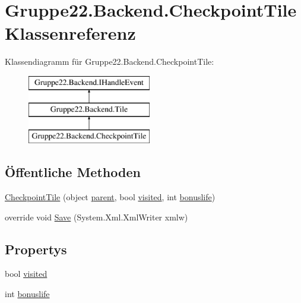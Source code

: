 \hypertarget{class_gruppe22_1_1_backend_1_1_checkpoint_tile}{\section{Gruppe22.\-Backend.\-Checkpoint\-Tile Klassenreferenz}
\label{class_gruppe22_1_1_backend_1_1_checkpoint_tile}
}
Klassendiagramm für Gruppe22.\-Backend.\-Checkpoint\-Tile\-:\begin{figure}[H]
\begin{center}
\leavevmode
\includegraphics[height=3.000000cm]{class_gruppe22_1_1_backend_1_1_checkpoint_tile}
\end{center}
\end{figure}
\subsection*{Öffentliche Methoden}
\begin{DoxyCompactItemize}
\item 
\hyperlink{class_gruppe22_1_1_backend_1_1_checkpoint_tile_a72935c5b488d2ef10c746a6f0b7ac8ba}{Checkpoint\-Tile} (object \hyperlink{class_gruppe22_1_1_backend_1_1_tile_abc12933c70eb3a2ebbb2fde9f45c2632}{parent}, bool \hyperlink{class_gruppe22_1_1_backend_1_1_checkpoint_tile_a3bbecce1496a23490a6034cb194e6882}{visited}, int \hyperlink{class_gruppe22_1_1_backend_1_1_checkpoint_tile_a4d7e2b4d2acf6d1ca8cff38851e070b7}{bonuslife})
\item 
override void \hyperlink{class_gruppe22_1_1_backend_1_1_checkpoint_tile_adf8bb109a7ea8e8e9e75d63fdac73f36}{Save} (System.\-Xml.\-Xml\-Writer xmlw)
\end{DoxyCompactItemize}
\subsection*{Propertys}
\begin{DoxyCompactItemize}
\item 
bool \hyperlink{class_gruppe22_1_1_backend_1_1_checkpoint_tile_a3bbecce1496a23490a6034cb194e6882}{visited}
\item 
int \hyperlink{class_gruppe22_1_1_backend_1_1_checkpoint_tile_a4d7e2b4d2acf6d1ca8cff38851e070b7}{bonuslife}
\end{DoxyCompactItemize}
